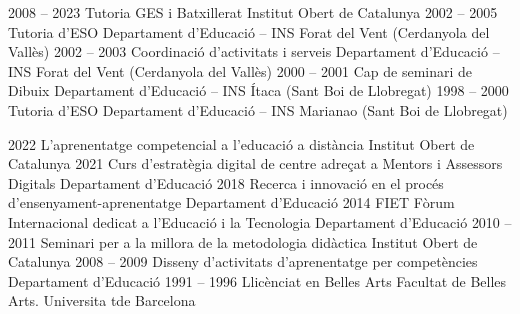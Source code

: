 \documentclass[9pt]{developercv} %
\begin{document}
\begin{entrylist}
   \entry
      {2008 -- 2023}
      {Tutoria GES i Batxillerat}
	  {Institut Obert de Catalunya}
      {}
    \entry
       {2002 -- 2005}
       {Tutoria d'ESO}
	   {Departament d'Educació -- INS Forat del Vent (Cerdanyola del Vallès)}
       {}
    \entry
       {2002 -- 2003}
       {Coordinació d'activitats i serveis}
	   {Departament d'Educació -- INS Forat del Vent (Cerdanyola del Vallès)}
       {}
    \entry
       {2000 -- 2001}
       {Cap de seminari de Dibuix}
	   {Departament d'Educació -- INS Ítaca (Sant Boi de Llobregat)}
       {}
    \entry
       {1998 -- 2000}
       {Tutoria d'ESO}
	   {Departament d'Educació -- INS Marianao (Sant Boi de Llobregat)}
       {}           
\end{entrylist}



\begin{entrylist}
    \entry
	  {2022}
	  {L'aprenentatge competencial a l'educació a distància}
	  {Institut Obert de Catalunya}
      {}
    \entry
	  {2021}
	  {Curs d'estratègia digital de centre adreçat a Mentors i Assessors Digitals}
	  {Departament d'Educació}
      {}
    \entry
	  {2018}
	  {Recerca i innovació en el procés d'ensenyament-aprenentatge}
	  {Departament d'Educació}
      {}
    \entry
	  {2014}
	  {FIET Fòrum Internacional dedicat a l'Educació i la Tecnologia}
	  {Departament d'Educació}
      {}
  \entry
	  {2010 -- 2011}
	  {Seminari per a la millora de la metodologia didàctica}
	  {Institut Obert de Catalunya}
      {}
  \entry
	  {2008 -- 2009}
	  {Disseny d'activitats d'aprenentatge per competències}
	  {Departament d'Educació}
      {}
  \entry
     {1991 -- 1996}
     {Llicènciat en Belles Arts}
     {Facultat de Belles Arts. Universita tde Barcelona}
     {}
\end{entrylist}

\end{document}
